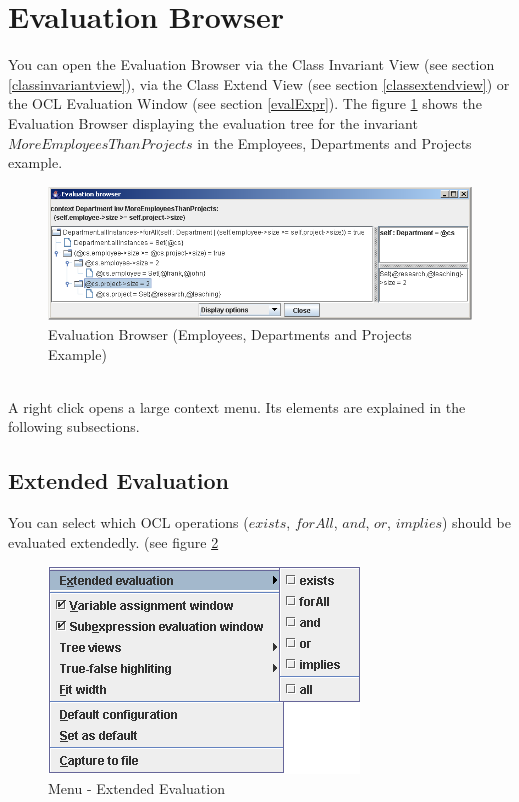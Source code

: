 \documentclass[a4paper,titlepage,oneside,final]{scrreprt} %
\begin{document}
\section{Evaluation Browser}\label{evaluationBrowserSec}
You can open the Evaluation Browser via the Class Invariant View (see section \ref{classinvariantview}),
via the Class Extend View (see section \ref{classextendview}) or
the OCL Evaluation Window (see section \ref{evalExpr}). The figure \ref{fig:EvaluationBrowser}
shows the Evaluation Browser displaying the evaluation tree for the invariant
$\mathit{MoreEmployeesThanProjects}$ in the Employees, Departments and Projects example.\\
\begin{figure}[ht]
\centering
\includegraphics[scale=0.5]{Screenshots/GUI/EvaluationBrowser.png}
\caption{Evaluation Browser (Employees, Departments and Projects Example)}
\label{fig:EvaluationBrowser}
\end{figure}\\
A right click opens a large context menu. Its elements are explained in the following
subsections.
\subsection{Extended Evaluation}
You can select which OCL operations ($\mathit{exists}$, $\mathit{forAll}$,
$\mathit{and}$, $\mathit{or}$, $\mathit{implies}$) should be evaluated extendedly. (see
figure \ref{fig:EvaluationBrowserExtended}
\begin{figure}[ht]
\centering
\includegraphics[scale=0.7]{Screenshots/GUI/EvaluationBrowserMenuExtended.png}
\caption{Menu - Extended Evaluation}
\label{fig:EvaluationBrowserExtended}
\end{figure}
\end{document}
